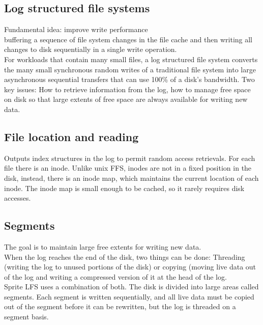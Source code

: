 \subsection{Log structured file systems}
Fundamental idea: improve write performance \\
buffering a sequence of file system changes in the file cache and then writing all changes to disk sequentially in a single write operation. \\
For workloads that contain many small files, a log structured file system converts the many small synchronous random writes of a traditional file system into large asynchronous sequential transfers that can use 100\% of a disk's bandwidth.
Two key issues: How to retrieve information from the log, how to manage free space on disk so that large extents of free space are always available for writing new data.
\subsection{File location and reading}
Outputs index structures in the log to permit random access retrievals. For each file there is an inode. Unlike unix FFS, inodes are not in a fixed position in the disk, instead, there is an inode map, which maintains the current location of each inode. The inode map is small enough to be cached, so it rarely requires disk accesses.
\subsection{Segments}
The goal is to maintain large free extents for writing new data. \\
When the log reaches the end of the disk, two things can be done: Threading (writing the log to unused portions of the disk) or copying (moving live data out of the log and writing a compressed version of it at the head of the log. \\
Sprite LFS uses a combination of both. The disk is divided into large areas called segments. Each segment is written sequentially, and all live data must be copied out of the segment before it can be rewritten, but the log is threaded on a segment basis.

